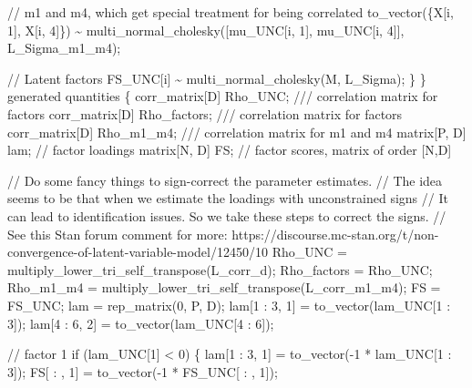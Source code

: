 \documentclass[
  letterpaper,
  DIV=11,
  numbers=noendperiod]{scrreprt}
\newenvironment{Shaded}{\begin{snugshade}}{\end{snugshade}}
\newcommand{\CommentTok}[1]{\textcolor[rgb]{0.37,0.37,0.37}{#1}}
\newcommand{\ControlFlowTok}[1]{\textcolor[rgb]{0.00,0.23,0.31}{#1}}
\newcommand{\DataTypeTok}[1]{\textcolor[rgb]{0.68,0.00,0.00}{#1}}
\newcommand{\DecValTok}[1]{\textcolor[rgb]{0.68,0.00,0.00}{#1}}
\newcommand{\KeywordTok}[1]{\textcolor[rgb]{0.00,0.23,0.31}{#1}}
\newcommand{\NormalTok}[1]{\textcolor[rgb]{0.00,0.23,0.31}{#1}}
\begin{document}
\begin{Shaded}
\begin{Highlighting}[]
    \CommentTok{// m1 and m4, which get special treatment for being correlated}
\NormalTok{    to\_vector(\{X[i, }\DecValTok{1}\NormalTok{], X[i, }\DecValTok{4}\NormalTok{]\}) \textasciitilde{} multi\_normal\_cholesky([mu\_UNC[i, }\DecValTok{1}\NormalTok{], mu\_UNC[i, }\DecValTok{4}\NormalTok{]]\textquotesingle{}, L\_Sigma\_m1\_m4);}

    \CommentTok{// Latent factors}
\NormalTok{    FS\_UNC[i] \textasciitilde{} multi\_normal\_cholesky(M, L\_Sigma);}
\NormalTok{  \}}
\NormalTok{\}}
\KeywordTok{generated quantities}\NormalTok{ \{}
  \DataTypeTok{corr\_matrix}\NormalTok{[D] Rho\_UNC; }\CommentTok{/// correlation matrix for factors}
  \DataTypeTok{corr\_matrix}\NormalTok{[D] Rho\_factors; }\CommentTok{/// correlation matrix for factors}
  \DataTypeTok{corr\_matrix}\NormalTok{[D] Rho\_m1\_m4; }\CommentTok{/// correlation matrix for m1 and m4}
  \DataTypeTok{matrix}\NormalTok{[P, D] lam; }\CommentTok{// factor loadings}
  \DataTypeTok{matrix}\NormalTok{[N, D] FS; }\CommentTok{// factor scores, matrix of order [N,D]}
  
  \CommentTok{// Do some fancy things to sign{-}correct the parameter estimates.}
  \CommentTok{// The idea seems to be that when we estimate the loadings with unconstrained signs}
  \CommentTok{// It can lead to identification issues. So we take these steps to correct the signs.}
  \CommentTok{// See this Stan forum comment for more: https://discourse.mc{-}stan.org/t/non{-}convergence{-}of{-}latent{-}variable{-}model/12450/10}
\NormalTok{  Rho\_UNC = multiply\_lower\_tri\_self\_transpose(L\_corr\_d);}
\NormalTok{  Rho\_factors = Rho\_UNC;}
\NormalTok{  Rho\_m1\_m4 = multiply\_lower\_tri\_self\_transpose(L\_corr\_m1\_m4);}
\NormalTok{  FS = FS\_UNC;}
\NormalTok{  lam = rep\_matrix(}\DecValTok{0}\NormalTok{, P, D);}
\NormalTok{  lam[}\DecValTok{1}\NormalTok{ : }\DecValTok{3}\NormalTok{, }\DecValTok{1}\NormalTok{] = to\_vector(lam\_UNC[}\DecValTok{1}\NormalTok{ : }\DecValTok{3}\NormalTok{]);}
\NormalTok{  lam[}\DecValTok{4}\NormalTok{ : }\DecValTok{6}\NormalTok{, }\DecValTok{2}\NormalTok{] = to\_vector(lam\_UNC[}\DecValTok{4}\NormalTok{ : }\DecValTok{6}\NormalTok{]);}
  
  \CommentTok{// factor 1}
  \ControlFlowTok{if}\NormalTok{ (lam\_UNC[}\DecValTok{1}\NormalTok{] \textless{} }\DecValTok{0}\NormalTok{) \{}
\NormalTok{    lam[}\DecValTok{1}\NormalTok{ : }\DecValTok{3}\NormalTok{, }\DecValTok{1}\NormalTok{] = to\_vector({-}}\DecValTok{1}\NormalTok{ * lam\_UNC[}\DecValTok{1}\NormalTok{ : }\DecValTok{3}\NormalTok{]);}
\NormalTok{    FS[ : , }\DecValTok{1}\NormalTok{] = to\_vector({-}}\DecValTok{1}\NormalTok{ * FS\_UNC[ : , }\DecValTok{1}\NormalTok{]);}
    

\end{Highlighting}
\end{Shaded}
\end{document}
